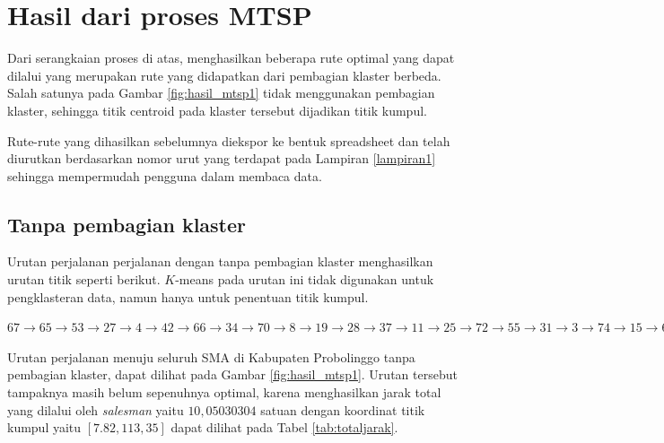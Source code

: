 \section{Hasil dari proses MTSP}

Dari serangkaian proses di atas, menghasilkan beberapa rute optimal yang dapat dilalui yang merupakan rute yang didapatkan dari pembagian klaster berbeda. Salah satunya pada Gambar \ref{fig:hasil_mtsp1} tidak menggunakan pembagian klaster, sehingga titik centroid pada klaster tersebut dijadikan titik kumpul.

Rute-rute yang dihasilkan sebelumnya diekspor ke bentuk spreadsheet dan telah diurutkan berdasarkan nomor urut yang terdapat pada Lampiran \ref{lampiran1} sehingga mempermudah pengguna dalam membaca data.

\subsection{Tanpa pembagian klaster}

Urutan perjalanan perjalanan dengan tanpa pembagian klaster menghasilkan urutan titik seperti berikut. $K$-means pada urutan ini tidak digunakan untuk pengklasteran data, namun hanya untuk penentuan titik kumpul.

$67\rightarrow65\rightarrow53\rightarrow27\rightarrow4\rightarrow42\rightarrow66\rightarrow34\rightarrow70\rightarrow8\rightarrow19\rightarrow28\rightarrow37\rightarrow11\rightarrow25\rightarrow72\rightarrow55\rightarrow31\rightarrow3\rightarrow74\rightarrow15\rightarrow68\rightarrow20\rightarrow44\rightarrow40\rightarrow16\rightarrow30\rightarrow23\rightarrow24\rightarrow63\rightarrow13\rightarrow29\rightarrow50\rightarrow7\rightarrow54\rightarrow2\rightarrow10\rightarrow52\rightarrow64\rightarrow21\rightarrow62\rightarrow58\rightarrow26\rightarrow1\rightarrow69\rightarrow14\rightarrow45\rightarrow61\rightarrow38\rightarrow59\rightarrow17\rightarrow71\rightarrow18\rightarrow32\rightarrow57\rightarrow73\rightarrow75\rightarrow41\rightarrow39\rightarrow49\rightarrow51\rightarrow6\rightarrow60\rightarrow22\rightarrow33\rightarrow48\rightarrow5\rightarrow35\rightarrow46\rightarrow56\rightarrow36\rightarrow47\rightarrow9\rightarrow12\rightarrow43$

Urutan perjalanan menuju seluruh SMA di Kabupaten Probolinggo tanpa pembagian klaster, dapat dilihat pada Gambar \ref{fig:hasil_mtsp1}. Urutan tersebut tampaknya masih belum sepenuhnya optimal, karena menghasilkan jarak total yang dilalui oleh \textit{salesman} yaitu $10,05030304$ satuan dengan koordinat titik kumpul yaitu $[7.82, 113,35]$ dapat dilihat pada Tabel \ref{tab:totaljarak}.


